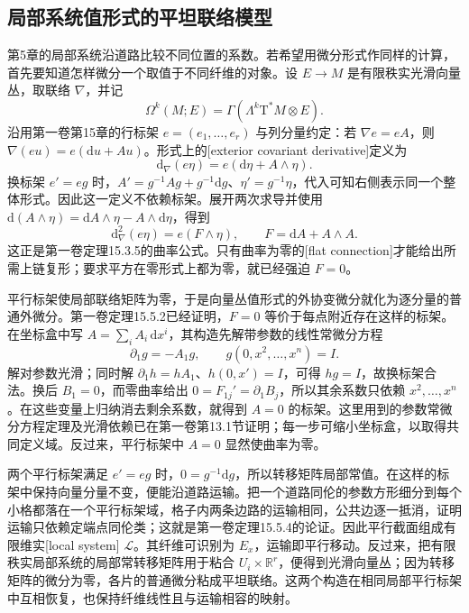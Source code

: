 \subsection{局部系统值形式的平坦联络模型}
\label{g2:subsec:0704:03}
第5章的局部系统沿道路比较不同位置的系数。若希望用微分形式作同样的计算，首先要知道怎样微分一个取值于不同纤维的对象。设 \(E\to M\) 是有限秩实光滑向量丛，取联络 \(\nabla\)，并记
\[
	\Omega^k(M;E)=\Gamma(\Lambda^k\mathrm T^*M\otimes E).
\]
沿用第一卷第15章的行标架 \(e=(e_1,\ldots,e_r)\) 与列分量约定：若 \(\nabla e=eA\)，则 \(\nabla(eu)=e(\mathrm du+Au)\)。形式上的[exterior covariant derivative]定义为
\begin{equation}\label{g2:eq:flat-valued-differential}
	\mathrm d_\nabla(e\eta)=e(\mathrm d\eta+A\wedge\eta).
\end{equation}
换标架 \(e'=eg\) 时，\(A'=g^{-1}Ag+g^{-1}\mathrm dg\)、\(\eta'=g^{-1}\eta\)，代入可知右侧表示同一个整体形式。因此这一定义不依赖标架。展开两次求导并使用 \(\mathrm d(A\wedge\eta)=\mathrm dA\wedge\eta-A\wedge\mathrm d\eta\)，得到
\begin{equation}\label{g2:eq:flat-curvature-square}
	\mathrm d_\nabla^2(e\eta)=e(F\wedge\eta),\qquad
	F=\mathrm dA+A\wedge A.
\end{equation}
这正是第一卷定理15.3.5的曲率公式。只有曲率为零的[flat connection]才能给出所需上链复形；要求平方在零形式上都为零，就已经强迫 \(F=0\)。

平行标架使局部联络矩阵为零，于是向量丛值形式的外协变微分就化为逐分量的普通外微分。第一卷定理15.5.2已经证明，\(F=0\) 等价于每点附近存在这样的标架。在坐标盒中写 \(A=\sum_i A_i\,\mathrm dx^i\)，其构造先解带参数的线性常微分方程
\[
	\partial_1g=-A_1g,\qquad g(0,x^2,\ldots,x^n)=I.
\]
解对参数光滑；同时解 \(\partial_1h=hA_1\)、\(h(0,x')=I\)，可得 \(hg=I\)，故换标架合法。换后 \(B_1=0\)，而零曲率给出 \(0=F_{1j}'=\partial_1B_j\)，所以其余系数只依赖 \(x^2,\ldots,x^n\)。在这些变量上归纳消去剩余系数，就得到 \(A=0\) 的标架。这里用到的参数常微分方程定理及光滑依赖已在第一卷第13.1节证明；每一步可缩小坐标盒，以取得共同定义域。反过来，平行标架中 \(A=0\) 显然使曲率为零。

两个平行标架满足 \(e'=eg\) 时，\(0=g^{-1}\mathrm dg\)，所以转移矩阵局部常值。在这样的标架中保持向量分量不变，便能沿道路运输。把一个道路同伦的参数方形细分到每个小格都落在一个平行标架域，格子内两条边路的运输相同，公共边逐一抵消，证明运输只依赖定端点同伦类；这就是第一卷定理15.5.4的论证。因此平行截面组成有限维实[local system] \(\mathcal L\)。其纤维可识别为 \(E_x\)，运输即平行移动。反过来，把有限秩实局部系统的局部常转移矩阵用于粘合 \(U_i\times\mathbb R^r\)，便得到光滑向量丛；因为转移矩阵的微分为零，各片的普通微分粘成平坦联络。这两个构造在相同局部平行标架中互相恢复，也保持纤维线性且与运输相容的映射。

